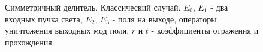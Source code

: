 \begin{figure}
\centering



\caption{Симметричный делитель. Классический случай.
  $E_0$, $E_1$ - два входных пучка света,
  $E_2$, $E_3$ - поля на выходе, операторы 
  уничтожения выходных мод поля, $r$ и $t$ - коэффициенты
  отражения и прохождения.}
\label{figPart2Interfero_1ex}
\end{figure}
